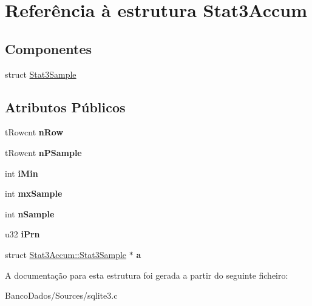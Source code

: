 \hypertarget{struct_stat3_accum}{\section{Referência à estrutura Stat3\-Accum}
\label{struct_stat3_accum}
}
\subsection*{Componentes}
\begin{DoxyCompactItemize}
\item 
struct \hyperlink{struct_stat3_accum_1_1_stat3_sample}{Stat3\-Sample}
\end{DoxyCompactItemize}
\subsection*{Atributos Públicos}
\begin{DoxyCompactItemize}
\item 
\hypertarget{struct_stat3_accum_a9232d8f0271bc7feff09927e1683fdfc}{t\-Rowcnt {\bfseries n\-Row}}\label{struct_stat3_accum_a9232d8f0271bc7feff09927e1683fdfc}

\item 
\hypertarget{struct_stat3_accum_aaad385a6c7100fc8674f98bee196d78d}{t\-Rowcnt {\bfseries n\-P\-Sample}}\label{struct_stat3_accum_aaad385a6c7100fc8674f98bee196d78d}

\item 
\hypertarget{struct_stat3_accum_a33a25df2bf3dae63cc1960d4e5586e1d}{int {\bfseries i\-Min}}\label{struct_stat3_accum_a33a25df2bf3dae63cc1960d4e5586e1d}

\item 
\hypertarget{struct_stat3_accum_a736d6f6da776d17f54a87e31a457f4bb}{int {\bfseries mx\-Sample}}\label{struct_stat3_accum_a736d6f6da776d17f54a87e31a457f4bb}

\item 
\hypertarget{struct_stat3_accum_a184bb13725f39f27c8d8af88a52d198e}{int {\bfseries n\-Sample}}\label{struct_stat3_accum_a184bb13725f39f27c8d8af88a52d198e}

\item 
\hypertarget{struct_stat3_accum_a44d4e5372a3656038d935b09e4d5d8de}{u32 {\bfseries i\-Prn}}\label{struct_stat3_accum_a44d4e5372a3656038d935b09e4d5d8de}

\item 
\hypertarget{struct_stat3_accum_ab4c3e63dea8ab19f10fd636e8062c108}{struct \hyperlink{struct_stat3_accum_1_1_stat3_sample}{Stat3\-Accum\-::\-Stat3\-Sample} $\ast$ {\bfseries a}}\label{struct_stat3_accum_ab4c3e63dea8ab19f10fd636e8062c108}

\end{DoxyCompactItemize}


A documentação para esta estrutura foi gerada a partir do seguinte ficheiro\-:\begin{DoxyCompactItemize}
\item 
Banco\-Dados/\-Sources/sqlite3.\-c\end{DoxyCompactItemize}
